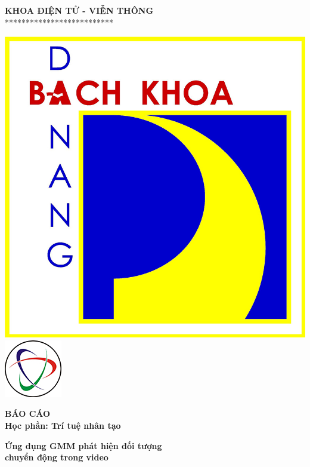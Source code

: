 \documentclass[a4paper]{article}
\begin{document}
\begin{titlepage}
\begin{center}
    \vspace{7pt}
    \textbf{KHOA ĐIỆN TỬ - VIỄN THÔNG} \\
    **************************
\end{center}
\vspace{10pt}
\begin{center}
    \includegraphics[scale=0.37]{images/logodut.jpg}
    \includegraphics[scale=0.75]{images/logoete.jpg}
    
    \vspace{20pt}
    \fontsize{20pt}{17pt}\selectfont 
    \textbf{BÁO CÁO} \\
    \vspace{7pt}
    \textbf{Học phần: Trí tuệ nhân tạo}
    \vspace{7pt}

\end{center}
\begin{flushleft}
    \fontsize{15pt}{10pt}\selectfont  
    \textbf{\textsl{}}
\end{flushleft}
\begin{center}
    \hspace{10pt}
    \fontsize{18pt}{17pt}\selectfont 
    \textbf{\textrm{Ứng dụng GMM phát hiện đối tượng \\ chuyển động trong video}}
\end{center}
\begin{center}
    \fontsize{16pt}{17pt}\selectfont 
    \textbf{\textrm{}}
\end{center}


\end{titlepage}
\end{document}
